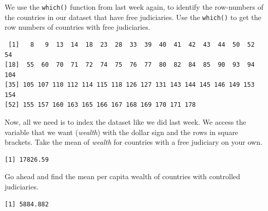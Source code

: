 \documentclass[]{article}
\newenvironment{Shaded}{\begin{snugshade}}{\end{snugshade}}
\newcommand{\KeywordTok}[1]{\textcolor[rgb]{0.13,0.29,0.53}{\textbf{#1}}}
\newcommand{\DecValTok}[1]{\textcolor[rgb]{0.00,0.00,0.81}{#1}}
\newcommand{\OperatorTok}[1]{\textcolor[rgb]{0.81,0.36,0.00}{\textbf{#1}}}
\newcommand{\NormalTok}[1]{#1}
\theoremstyle{definition}
\theoremstyle{definition}
\theoremstyle{definition}
\theoremstyle{remark}
\begin{document}
We use the \texttt{which()} function from last week again, to identify
the row-numbers of the countries in our dataset that have free
judiciaries. Use the \texttt{which()} to get the row numbers of
countries with free judiciaries.

\begin{Shaded}
\end{Shaded}

\begin{verbatim}
 [1]   8   9  13  14  18  23  28  33  39  40  41  42  43  44  50  52  54
[18]  55  60  70  71  72  74  75  76  77  80  82  84  85  90  93  94 104
[35] 105 107 110 112 114 115 118 126 127 131 143 144 145 146 149 153 154
[52] 155 157 160 163 165 166 167 168 169 170 171 178
\end{verbatim}

Now, all we need is to index the dataset like we did last week. We
access the variable that we want (\emph{wealth}) with the dollar sign
and the rows in square brackets. Take the mean of \emph{wealth} for
countries with a free judiciary on your own.

\begin{Shaded}
\end{Shaded}

\begin{verbatim}
[1] 17826.59
\end{verbatim}

Go ahead and find the mean per capita wealth of countries with
controlled judiciaries.

\begin{Shaded}
\end{Shaded}

\begin{verbatim}
[1] 5884.882
\end{verbatim}
\end{document}
